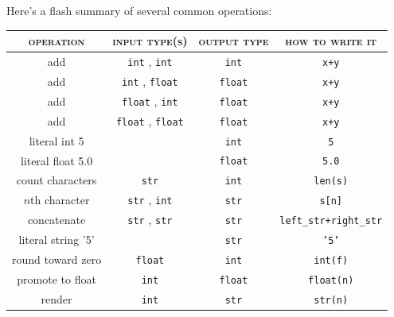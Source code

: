 \documentclass[11pt, justified]{tufte-book}
\theoremstyle{definition}
\begin{document}
        Here's a flash summary of several common operations: 

        \begin{table}[h]
          \begin{tabular}{cccc}
            \textsc{operation}  &\textsc{input type(s)}           &\textsc{output type} &\textsc{how to write it}               \\
            \hline
            add                 &\texttt{int}   , \texttt{int}    &\texttt{int}         &\texttt{x+y}                           \\
            add                 &\texttt{int}   , \texttt{float}  &\texttt{float}       &\texttt{x+y}                           \\
            add                 &\texttt{float} , \texttt{int}    &\texttt{float}       &\texttt{x+y}                           \\
            add                 &\texttt{float} , \texttt{float}  &\texttt{float}       &\texttt{x+y}                           \\
            literal int 5       &                                 &\texttt{int}         &\texttt{5}                             \\
            literal float 5.0   &                                 &\texttt{float}       &\texttt{5.0}                           \\
            \hline
            count characters    &\texttt{str}                     &\texttt{int}         &\texttt{len(s)}                        \\
            $n$th character     &\texttt{str}   , \texttt{int}    &\texttt{str}         &\texttt{s[n]}                          \\
            concatenate         &\texttt{str}   , \texttt{str}    &\texttt{str}         &\texttt{left\_str+right\_str}          \\
            literal string '5'  &                                 &\texttt{str}         &\texttt{'5'}                           \\
            \hline
            round toward zero   &\texttt{float}                   &\texttt{int}         &\texttt{int(f)}                        \\
            promote to float    &\texttt{int}                     &\texttt{float}       &\texttt{float(n)}                      \\
            render              &\texttt{int}                     &\texttt{str}         &\texttt{str(n)}                        \\

\end{tabular}
\end{table}
\end{document}
